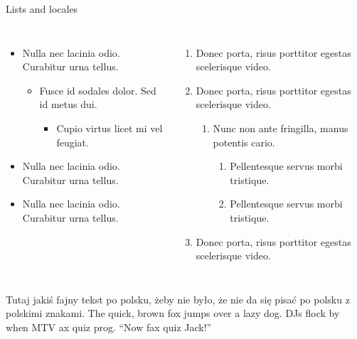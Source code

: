 \documentclass{beamer}
\begin{document}
\begin{frame}[label=lists]{Lists and locales}
    \begin{columns}[onlytextwidth]
        \begin{itemize}
        \item Nulla nec lacinia odio. Curabitur urna tellus.
        \begin{itemize}
            \item Fusce id sodales dolor. Sed id metus dui.
            \begin{itemize}
            \item Cupio virtus licet mi vel feugiat.
            \end{itemize}
        \end{itemize}
        \item Nulla nec lacinia odio. Curabitur urna tellus.
        \item Nulla nec lacinia odio. Curabitur urna tellus.
        \end{itemize}
        \begin{enumerate}
        \item Donec porta, risus porttitor egestas scelerisque video.
        \item Donec porta, risus porttitor egestas scelerisque video.
        \begin{enumerate}
            \item Nunc non ante fringilla, manus potentis cario.
            \begin{enumerate}
            \item Pellentesque servus morbi tristique.
            \item Pellentesque servus morbi tristique.
            \end{enumerate}
        \end{enumerate}
        \item Donec porta, risus porttitor egestas scelerisque video.
        \end{enumerate}
    \end{columns}
    \bigskip
    \justifying

    {Tutaj jakiś fajny tekst po polsku, żeby nie było, że
    nie da się pisać po polsku z polskimi znakami.}
    {The quick, brown fox jumps over a lazy
    dog. DJs flock by when MTV ax quiz prog. “Now fax quiz Jack!”}
\end{frame}
\end{document}
